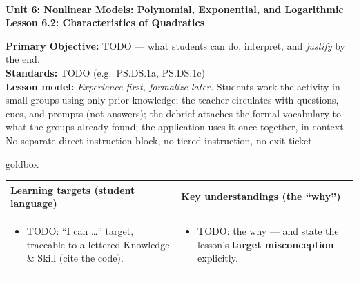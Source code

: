 \documentclass[10pt]{article}
\newcommand{\UnitNumberName}{Unit 6: Nonlinear Models: Polynomial, Exponential, and Logarithmic \quad}
\newcommand{\LessonNumberName}{Lesson 6.2: Characteristics of Quadratics}
\begin{document}
\begin{center}
    {\Large\bfseries \CourseName \\
    {\small\bfseries \UnitNumberName \LessonNumberName}}
\end{center}

\begin{tcolorbox}[colback=frost, colframe=cerulean, boxrule=0.9pt, arc=2mm,
    left=2mm, right=2mm, top=1.5mm, bottom=1.5mm]
    \textbf{Primary Objective:} TODO --- what students can do, interpret, and \emph{justify}
    by the end.
    \\[2pt]
    \textbf{Standards:} TODO (e.g.\ PS.DS.1a, PS.DS.1c)
    \\[2pt]
    \textbf{Lesson model:} \emph{Experience first, formalize later.} Students work the activity
    in small groups using only prior knowledge; the teacher circulates with questions, cues, and
    prompts (not answers); the debrief attaches the formal vocabulary to what the groups already
    found; the application uses it once together, in context. No separate direct-instruction
    block, no tiered instruction, no exit ticket.
\end{tcolorbox}

\renewcommand{\arraystretch}{1.4}
\begin{skillbox}{goldbox}
\begin{tabularx}{\linewidth}{@{}X|X@{}}
\textbf{Learning targets (student language)} & \textbf{Key understandings (the ``why'')} \\[2pt]
\hline
\vspace{-6pt}
\begin{itemize}[leftmargin=1.1em, nosep, after=\vspace{2pt}]
  \item TODO: ``I can \dots'' target, traceable to a lettered Knowledge \& Skill (cite the code).
\end{itemize}
&
\vspace{-6pt}
\begin{itemize}[leftmargin=1.1em, nosep, after=\vspace{2pt}]
  \item TODO: the why --- and state the lesson's \textbf{target misconception} explicitly.
\end{itemize}
\end{tabularx}
\end{skillbox}
\end{document}
